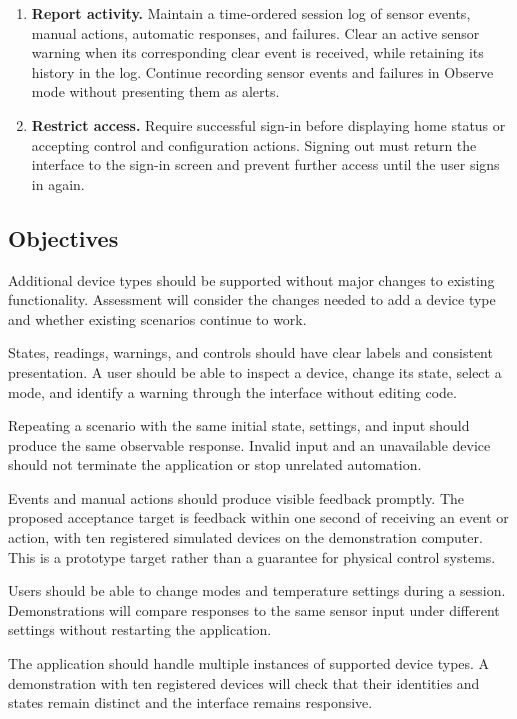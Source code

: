 \documentclass[12pt,letterpaper]{report}
\begin{document}
\begin{enumerate}[label=\textbf{F\arabic*.},leftmargin=*]
  \item \textbf{Report activity.} Maintain a time-ordered session log of sensor events, manual actions, automatic responses, and failures. Clear an active sensor warning when its corresponding clear event is received, while retaining its history in the log. Continue recording sensor events and failures in Observe mode without presenting them as alerts.
  \item \textbf{Restrict access.} Require successful sign-in before displaying home status or accepting control and configuration actions. Signing out must return the interface to the sign-in screen and prevent further access until the user signs in again.
\end{enumerate}

\subsection{Objectives}
\begin{description}[style=nextline]
  \item[Extensible and maintainable.]
  Additional device types should be supported without major changes to existing functionality. Assessment will consider the changes needed to add a device type and whether existing scenarios continue to work.
  \item[Usable and consistent.]
  States, readings, warnings, and controls should have clear labels and consistent presentation. A user should be able to inspect a device, change its state, select a mode, and identify a warning through the interface without editing code.
  \item[Reliable and robust.]
  Repeating a scenario with the same initial state, settings, and input should produce the same observable response. Invalid input and an unavailable device should not terminate the application or stop unrelated automation.
  \item[Responsive.]
  Events and manual actions should produce visible feedback promptly. The proposed acceptance target is feedback within one second of receiving an event or action, with ten registered simulated devices on the demonstration computer. This is a prototype target rather than a guarantee for physical control systems.
  \item[Flexible.]
  Users should be able to change modes and temperature settings during a session. Demonstrations will compare responses to the same sensor input under different settings without restarting the application.
  \item[Scalable within the project scope.]
  The application should handle multiple instances of supported device types. A demonstration with ten registered devices will check that their identities and states remain distinct and the interface remains responsive.
\end{description}
\end{document}
